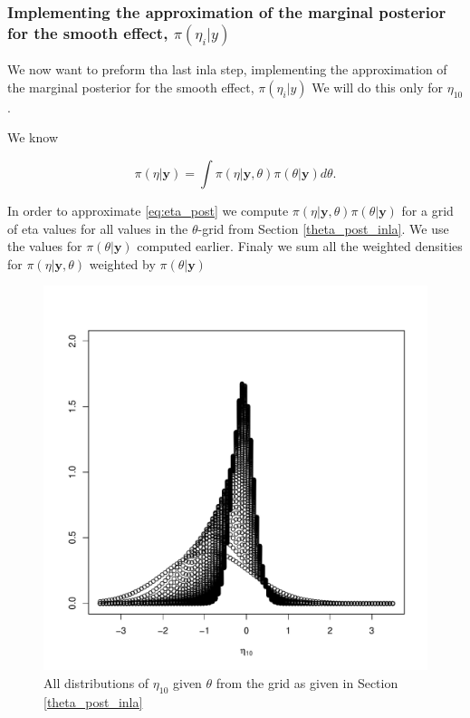 \subsubsection{Implementing the approximation of the marginal posterior for the smooth effect, $\pi(\eta_i | y)$}

We now want to preform tha last inla step, implementing the approximation of the marginal posterior for the smooth effect, $\pi(\eta_i | y)$ We will do this only for $\eta_{10}$. 

We know 

\begin{equation}
\label{eq:eta_post}
    \pi(\eta|\boldsymbol{y}) = \int \pi(\eta|\boldsymbol{y}, \theta) \pi(\theta|\boldsymbol{y}) d\theta.
\end{equation}

In order to approximate \eqref{eq:eta_post} we compute $\pi(\eta|\boldsymbol{y}, \theta) \pi(\theta|\boldsymbol{y})$ for a grid of eta values for all values in the $\theta$-grid from Section \ref{theta_post_inla}. We use the values for $\pi(\theta|\boldsymbol{y})$ computed earlier. Finaly we sum all the weighted densities for $\pi(\eta|\boldsymbol{y}, \theta)$ weighted by $\pi(\theta|\boldsymbol{y})$







\begin{figure}
    \centering
    \includegraphics[width=\textwidth]{Images/eta_10.pdf}
    \caption{All distributions of $\eta_{10}$ given $\theta$ from the grid as given in Section \ref{theta_post_inla}}
    \label{fig:eta_all}
\end{figure}



